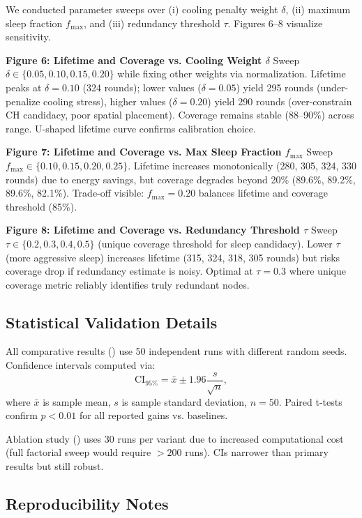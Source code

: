 We conducted parameter sweeps over (i) cooling penalty weight $\delta$, (ii) maximum sleep fraction $f_{\max}$, and (iii) redundancy threshold $\tau$. Figures 6--8 visualize sensitivity.

\textbf{Figure 6: Lifetime and Coverage vs. Cooling Weight $\delta$}  
Sweep $\delta \in \{0.05, 0.10, 0.15, 0.20\}$ while fixing other weights via normalization. Lifetime peaks at $\delta=0.10$ (324 rounds); lower values ($\delta=0.05$) yield 295 rounds (under-penalize cooling stress), higher values ($\delta=0.20$) yield 290 rounds (over-constrain CH candidacy, poor spatial placement). Coverage remains stable (88--90\%) across range. U-shaped lifetime curve confirms calibration choice.

\textbf{Figure 7: Lifetime and Coverage vs. Max Sleep Fraction $f_{\max}$}  
Sweep $f_{\max} \in \{0.10, 0.15, 0.20, 0.25\}$. Lifetime increases monotonically (280, 305, 324, 330 rounds) due to energy savings, but coverage degrades beyond 20\% (89.6\%, 89.2\%, 89.6\%, 82.1\%). Trade-off visible: $f_{\max}=0.20$ balances lifetime and coverage threshold (85\%).

\textbf{Figure 8: Lifetime and Coverage vs. Redundancy Threshold $\tau$}  
Sweep $\tau \in \{0.2, 0.3, 0.4, 0.5\}$ (unique coverage threshold for sleep candidacy). Lower $\tau$ (more aggressive sleep) increases lifetime (315, 324, 318, 305 rounds) but risks coverage drop if redundancy estimate is noisy. Optimal at $\tau=0.3$ where unique coverage metric reliably identifies truly redundant nodes.

\subsection{Statistical Validation Details}

All comparative results () use 50 independent runs with different random seeds. Confidence intervals computed via:
\begin{equation}
\text{CI}_{95\%} = \bar{x} \pm 1.96 \frac{s}{\sqrt{n}},
\end{equation}
where $\bar{x}$ is sample mean, $s$ is sample standard deviation, $n=50$. Paired t-tests confirm $p<0.01$ for all reported gains vs. baselines.

Ablation study () uses 30 runs per variant due to increased computational cost (full factorial sweep would require $>200$ runs). CIs narrower than primary results but still robust.

\subsection{Reproducibility Notes}

